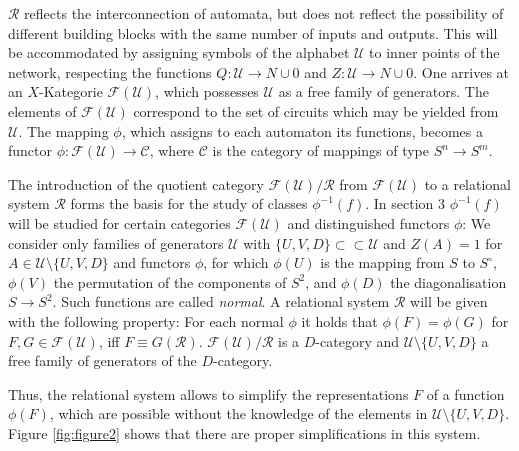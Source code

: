 \documentclass{article}
\begin{document}
$\mathcal{R}$ reflects the interconnection of automata, but does not reflect the possibility of different building blocks with the same number of inputs and outputs. This will be accommodated by assigning symbols of the alphabet $\mathcal{U}$ to inner points of the network, respecting the functions $Q : \mathcal{U} \rightarrow N \cup {0}$ and $Z : \mathcal{U} \rightarrow N \cup {0}$. One arrives at an $X$-Kategorie $\mathcal{F}(\mathcal{U})$, which possesses $\mathcal{U}$ as a free family of
generators. The elements of $\mathcal{F}(\mathcal{U})$ correspond to the set of circuits which may be yielded from $\mathcal{U}$. The mapping $\phi$, which assigns to each automaton its functions, becomes a functor $\phi:\mathcal{F}(\mathcal{U}) \rightarrow \mathcal{C}$, where $\mathcal{C}$ is the category of mappings of type $S^n \rightarrow S^m$. 

The introduction of the quotient category  $\mathcal{F}(\mathcal{U})/\mathcal{R}$ from $\mathcal{F}(\mathcal{U})$ to a relational system $\mathcal{R}$ forms the basis for the study of classes $\phi^{-1}(f)$. In section 3 $\phi^{-1}(f)$ will be studied for certain categories $\mathcal{F(U)}$ and distinguished functors $\phi$: We consider only families of generators $\mathcal{U}$ with $\{U, V, D\} \subset \subset \mathcal{U}$ and $Z(A) = 1$ for $A\in \mathcal{U} \setminus \{U, V, D\}$ and functors $\phi$, for which $\phi(U)$ is the mapping from $S$
to $S^{\circ}$, $\phi(V)$ the permutation of the components of $S^2$, and $\phi(D)$ the diagonalisation $S \rightarrow S^2$. Such functions are called \emph{normal}. A relational system $\mathcal{R}$ will be given with the following property: For each normal $\phi$ it holds that $\phi(F) = \phi(G)$ for $F, G \in \mathcal{F}(\mathcal{U})$, iff $F\equiv G(\mathcal{R})$. $\mathcal{F}(\mathcal{U})/\mathcal{R}$ is a $D$-category and $\mathcal{U} \setminus \{U, V, D\}$ a free family of generators of the
$D$-category.

Thus, the relational system allows to simplify the representations $F$ of a function $\phi(F)$, which are possible without the knowledge of the elements in $\mathcal{U} \setminus \{ U, V, D \}$. Figure \ref{fig:figure2} shows that there are proper simplifications in this system.
\end{document}
